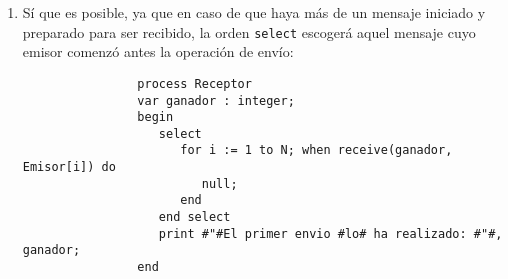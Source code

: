\begin{ejercicio}
\begin{enumerate}[label=(\alph*)]
        \item Sí que es posible, ya que en caso de que haya más de un mensaje iniciado y preparado para ser recibido, la orden \verb|select| escogerá aquel mensaje cuyo emisor comenzó antes la operación de envío:
            \begin{verbatim}
                process Receptor
                var ganador : integer;
                begin
                   select
                      for i := 1 to N; when receive(ganador, Emisor[i]) do
                         null;
                      end
                   end select
                   print #"#El primer envio #lo# ha realizado: #"#, ganador;
                end
            \end{verbatim}
    \end{enumerate}
\end{ejercicio}


